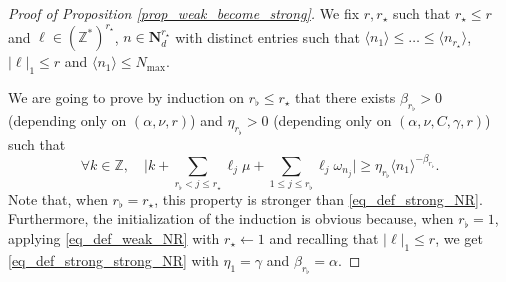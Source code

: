 \documentclass[11pt]{article}
\theoremstyle{definition}
\begin{document}
\begin{proof}[Proof of Proposition \ref{prop_weak_become_strong}] We fix $r,r_\star$ such that $r_\star \leq r$ and $\ell \in (\mathbb{Z}^*)^{r_\star}$, $n \in \mathbf{N}_d^{r_\star}$ with distinct entries such that $\langle n_1 \rangle \leq \dots \leq \langle n_{r_\star} \rangle$, $|\ell|_1 \leq r$ and $\langle n_1 \rangle \leq N_{\max}$.

We are going to prove by induction on $r_{\flat}\leq r_\star$ that there exists $\beta_{r_\flat}>0$ (depending only on $(\alpha,\nu,r)$) and $\eta_{r_\flat} >0$ (depending only on $(\alpha,\nu,C,\gamma,r)$) such that
\begin{equation}
\label{eq_def_strong_strong_NR}
\forall k \in \mathbb{Z}, \quad \biggl| k + \sum_{r_{\flat} <j \leq r_\star} \ell_j \mu + \sum_{1\leq j \leq r_{\flat} }\ell_j \omega_{n_j} \biggr| \geq \eta_{r_\flat} \langle n_{1} \rangle^{-\beta_{r_\flat}}.
\end{equation}
Note that, when $r_{\flat}= r_\star$, this property is stronger than \eqref{eq_def_strong_NR}. Furthermore, the initialization of the induction is obvious because, when $r_{\flat}=1$, applying \eqref{eq_def_weak_NR} with $r_\star \leftarrow 1$ and recalling that $|\ell|_1 \leq r$, we get \eqref{eq_def_strong_strong_NR} with $\eta_{1} = \gamma$ and $\beta_{r_\flat} = \alpha$.


\end{proof}
\end{document}
